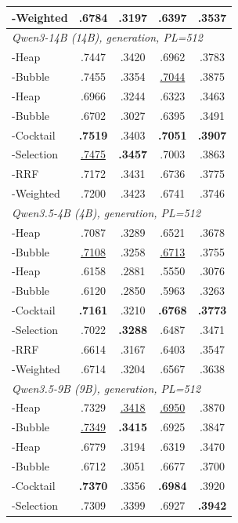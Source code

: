 \begin{table}[!htbp]
\begin{tabular}{l|cc|cc}
\bidir{}-Weighted & .6784 & .3197 & .6397 & .3537 \\
\midrule
\multicolumn{5}{l}{\textit{Qwen3-14B (14B), generation, PL=512}} \\
\topdown{}-Heap & .7447 & .3420 & .6962 & .3783 \\
\topdown{}-Bubble & .7455 & .3354 & \underline{.7044} & .3875 \\
\bottomup{}-Heap & .6966 & .3244 & .6323 & .3463 \\
\bottomup{}-Bubble & .6702 & .3027 & .6395 & .3491 \\
\dualend{}-Cocktail & \textbf{.7519} & .3403 & \textbf{.7051} & \textbf{.3907} \\
\dualend{}-Selection & \underline{.7475} & \textbf{.3457} & .7003 & .3863 \\
\bidir{}-RRF & .7172 & .3431 & .6736 & .3775 \\
\bidir{}-Weighted & .7200 & .3423 & .6741 & .3746 \\
\midrule
\multicolumn{5}{l}{\textit{Qwen3.5-4B (4B), generation, PL=512}} \\
\topdown{}-Heap & .7087 & .3289 & .6521 & .3678 \\
\topdown{}-Bubble & \underline{.7108} & .3258 & \underline{.6713} & .3755 \\
\bottomup{}-Heap & .6158 & .2881 & .5550 & .3076 \\
\bottomup{}-Bubble & .6120 & .2850 & .5963 & .3263 \\
\dualend{}-Cocktail & \textbf{.7161} & .3210 & \textbf{.6768} & \textbf{.3773} \\
\dualend{}-Selection & .7022 & \textbf{.3288} & .6487 & .3471 \\
\bidir{}-RRF & .6614 & .3167 & .6403 & .3547 \\
\bidir{}-Weighted & .6714 & .3204 & .6567 & .3638 \\
\midrule
\multicolumn{5}{l}{\textit{Qwen3.5-9B (9B), generation, PL=512}} \\
\topdown{}-Heap & .7329 & \underline{.3418} & \underline{.6950} & .3870 \\
\topdown{}-Bubble & \underline{.7349} & \textbf{.3415} & .6925 & .3847 \\
\bottomup{}-Heap & .6779 & .3194 & .6319 & .3470 \\
\bottomup{}-Bubble & .6712 & .3051 & .6677 & .3700 \\
\dualend{}-Cocktail & \textbf{.7370} & .3356 & \textbf{.6984} & .3920 \\
\dualend{}-Selection & .7309 & .3399 & .6927 & \textbf{.3942} \\

\end{tabular}
\end{table}
